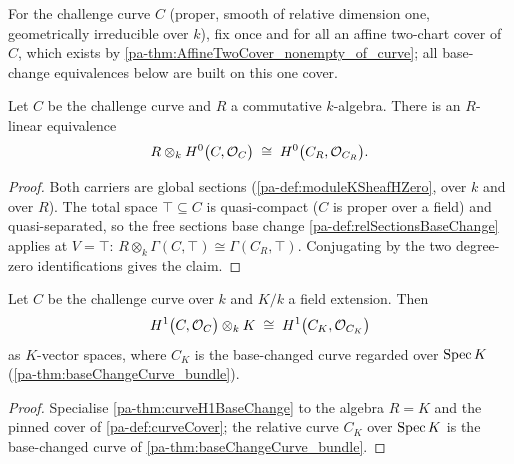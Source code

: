 \begin{definition}
  \label{pa-def:curveCover}
  \leanok

  For the challenge curve \(C\) (proper, smooth of relative dimension one,
  geometrically irreducible over \(k\)), fix once and for all an affine two-chart cover
  of \(C\), which exists by \ref{pa-thm:AffineTwoCover_nonempty_of_curve}; all base-change
  equivalences below are built on this one cover.
\end{definition}

\begin{theorem}
  \label{pa-thm:curveH0BaseChange}
  \leanok

  Let \(C\) be the challenge curve and \(R\) a commutative \(k\)-algebra. There is an
  \(R\)-linear equivalence
  \[
    R \otimes_k H^0\bigl(C, \mathcal{O}_{C}\bigr) \;\cong\; H^0\bigl(C_R, \mathcal{O}_{C_R}\bigr).
  \]
\end{theorem}
\begin{proof}
  \leanok
  Both carriers are global sections (\ref{pa-def:moduleKSheafHZero}, over \(k\) and over
  \(R\)). The total space \(\top \subseteq C\) is quasi-compact (\(C\) is proper over a
  field) and quasi-separated, so the free sections base change
  \ref{pa-def:relSectionsBaseChange} applies at \(V = \top\):
  \(R \otimes_k \Gamma(C, \top) \cong \Gamma(C_R, \top)\). Conjugating by the two
  degree-zero identifications gives the claim.
\end{proof}

\begin{theorem}
  \label{pa-thm:h1BaseFieldEquiv}
  \leanok

  Let \(C\) be the challenge curve over \(k\) and \(K/k\) a field extension. Then
  \[
    H^1\bigl(C, \mathcal{O}_{C}\bigr) \otimes_k K \;\cong\; H^1\bigl(C_K, \mathcal{O}_{C_K}\bigr)
  \]
  as \(K\)-vector spaces, where \(C_K\) is the base-changed curve regarded over
  \(\operatorname{Spec} K\) (\ref{pa-thm:baseChangeCurve_bundle}).
\end{theorem}
\begin{proof}
  \leanok
  Specialise \ref{pa-thm:curveH1BaseChange} to the algebra \(R = K\) and the pinned cover
  of \ref{pa-def:curveCover}; the relative curve \(C_K\) over \(\operatorname{Spec} K\) is the
  base-changed curve of \ref{pa-thm:baseChangeCurve_bundle}.
\end{proof}

